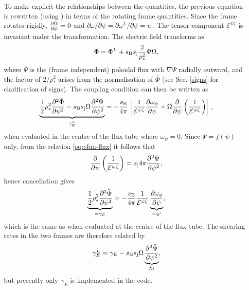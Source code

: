 To make explicit the relationships between the quantities, the previous equation 
is rewritten (using ) in terms of the rotating frame quantities.
Since the frame rotates rigidly, ${\partial \Omega \over
\partial \psi}=0$ and ${\partial \omega / \partial \psi} = {\partial \omega^L / \partial \psi} = u^\prime$. 
The tensor component $\mathcal{E}^{\psi \zeta}$ is invariant under the transformation.
The electric field transforms \cite{PEE09} as
\begin{equation}
\bar{\Phi}=\bar{\Phi}^L + s_{\rm B} s_{\rm j}{2 \over \rho_*^2}\Psi \Omega ,
\end{equation}
where $\Psi$ is the (frame independent) poloidal flux with $\nabla \Psi$ radially outward, 
and the factor of $2 / \rho_*^2$ arises from the normalisation of $\bar{\Phi}$ (see Sec. \ref{signs} for clarification of signs).  
The coupling condition can then be written as 
\begin{equation}
 \underbrace{{1 \over 2} \rho_*^2 {\partial^2 \bar{\Phi} \over \partial \psi^2}
-s_{\rm B} s_{\rm j}  {\Omega}{\partial^2 \Psi \over
\partial \psi^2}}_{\gamma_E^L} = - {s_{\rm B} \over 4 \pi}\left[{1 \over
\mathcal{E}^{\psi \zeta}}{\partial \omega_{\phi} \over \partial \psi} +
\Omega{\partial \over \partial \psi} \left({1 \over \mathcal{E}^{\psi \zeta}}\right)\right],
\end{equation}
when evaluated in the centre of the flux tube where $\omega_\psi = 0$.
Since $\Psi=f(\psi)$ only, from the relation \ref{eq:efun-flux}
it follows that
\begin{equation}
 {\partial \over \partial \psi} \left({1 \over \mathcal{E}^{\psi \zeta}}\right) = s_{\rm j} 4 \pi 
{\partial^2 \Psi \over \partial \psi^2},
\end{equation}
hence cancellation gives 
\begin{equation}
 \underbrace{{1 \over 2} \rho_*^2 {\partial^2 \bar{\Phi} \over \partial \psi^2}}_{=\gamma_E}
 = - {s_{\rm B} \over 4 \pi}{1 \over
\mathcal{E}^{\psi \zeta}}\underbrace{\partial \omega_{\phi} \over \partial \psi}_{=u^\prime},
\end{equation}
which is the same as  when evaluated at the centre of the flux tube.  The shearing rates in the two frames are therefore related by
\begin{equation}
 \gamma_E^L = \gamma_E - s_{\rm B} s_{\rm j}{\Omega}\underbrace{{\partial^2 \bar{\Psi} \over \partial \psi^2}}_{\cal{M}},
\end{equation}
but presently only $\gamma_E$ is implemented in the code.


